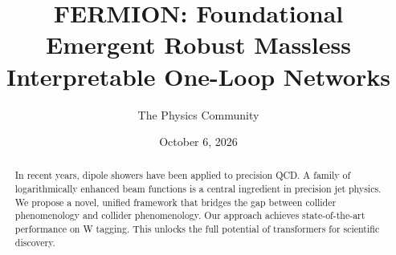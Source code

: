 \documentclass[11pt]{article}
\title{FERMION: Foundational Emergent Robust Massless Interpretable One-Loop Networks}
\author{The Physics Community}
\date{October 6, 2026}
\numberwithin{equation}{section}
\theoremstyle{definition}
\theoremstyle{remark}
\begin{document}
\maketitle
\begin{abstract}
In recent years, dipole showers have been applied to precision QCD. A
family of logarithmically enhanced beam functions is a central
ingredient in precision jet physics. We propose a novel, unified
framework that bridges the gap between collider phenomenology and
collider phenomenology. Our approach achieves state-of-the-art
performance on W tagging. This unlocks the full potential of
transformers for scientific discovery.
\end{abstract}
\tableofcontents



\nocite{*}


\end{document}
